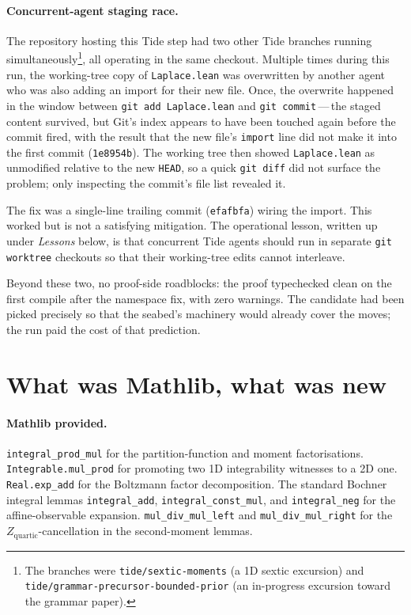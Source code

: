 \documentclass[11pt]{article}
\begin{document}
\paragraph{Concurrent-agent staging race.}
The repository hosting this Tide step had two other Tide branches
running simultaneously\footnote{The branches were
\texttt{tide/sextic-moments} (a 1D sextic excursion) and
\texttt{tide/grammar-precursor-bounded-prior} (an in-progress excursion
toward the grammar paper).}, all operating in the same checkout.
Multiple times during this run, the working-tree copy of
\texttt{Laplace.lean} was overwritten by another agent who was also
adding an import for their new file. Once, the overwrite happened in
the window between \texttt{git add Laplace.lean} and
\texttt{git commit}\,---\,the staged content survived, but Git's index
appears to have been touched again before the commit fired, with the
result that the new file's \texttt{import} line did not make it into
the first commit (\texttt{1e8954b}). The working tree then showed
\texttt{Laplace.lean} as unmodified relative to the new \texttt{HEAD},
so a quick \texttt{git diff} did not surface the problem; only
inspecting the commit's file list revealed it.

The fix was a single-line trailing commit (\texttt{efafbfa}) wiring the
import. This worked but is not a satisfying mitigation. The operational
lesson, written up under \emph{Lessons} below, is that concurrent Tide
agents should run in separate \texttt{git worktree} checkouts so that
their working-tree edits cannot interleave.

Beyond these two, no proof-side roadblocks: the proof typechecked clean
on the first compile after the namespace fix, with zero warnings. The
candidate had been picked precisely so that the seabed's machinery would
already cover the moves; the run paid the cost of that prediction.

\section{What was Mathlib, what was new}

\paragraph{Mathlib provided.}
\texttt{integral\_prod\_mul} for the partition-function and moment
factorisations. \texttt{Integrable.mul\_prod} for promoting two 1D
integrability witnesses to a 2D one. \texttt{Real.exp\_add} for the
Boltzmann factor decomposition. The standard Bochner integral lemmas
\texttt{integral\_add}, \texttt{integral\_const\_mul}, and
\texttt{integral\_neg} for the affine-observable expansion.
\texttt{mul\_div\_mul\_left} and \texttt{mul\_div\_mul\_right} for the
$Z_{\text{quartic}}$-cancellation in the second-moment lemmas.
\end{document}
